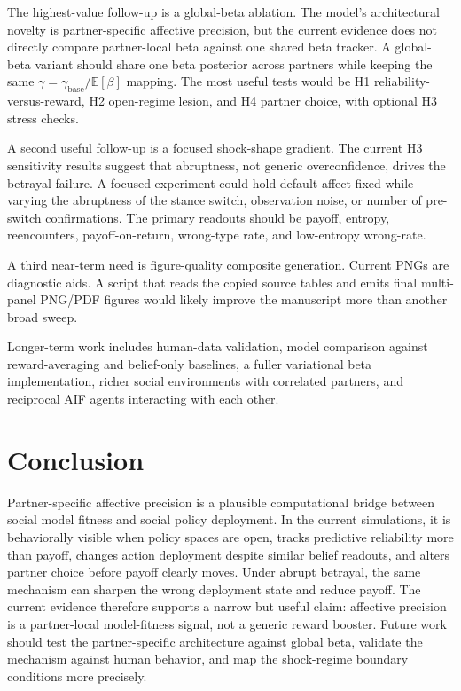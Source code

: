 The highest-value follow-up is a global-beta ablation. The model's architectural novelty is partner-specific affective precision, but the current evidence does not directly compare partner-local beta against one shared beta tracker. A global-beta variant should share one beta posterior across partners while keeping the same $\gamma=\gamma_{\mathrm{base}}/\mathbb{E}[\beta]$ mapping. The most useful tests would be H1 reliability-versus-reward, H2 open-regime lesion, and H4 partner choice, with optional H3 stress checks.

A second useful follow-up is a focused shock-shape gradient. The current H3 sensitivity results suggest that abruptness, not generic overconfidence, drives the betrayal failure. A focused experiment could hold default affect fixed while varying the abruptness of the stance switch, observation noise, or number of pre-switch confirmations. The primary readouts should be payoff, entropy, reencounters, payoff-on-return, wrong-type rate, and low-entropy wrong-rate.

A third near-term need is figure-quality composite generation. Current PNGs are diagnostic aids. A script that reads the copied source tables and emits final multi-panel PNG/PDF figures would likely improve the manuscript more than another broad sweep.

Longer-term work includes human-data validation, model comparison against reward-averaging and belief-only baselines, a fuller variational beta implementation, richer social environments with correlated partners, and reciprocal AIF agents interacting with each other.

\section{Conclusion}

Partner-specific affective precision is a plausible computational bridge between social model fitness and social policy deployment. In the current simulations, it is behaviorally visible when policy spaces are open, tracks predictive reliability more than payoff, changes action deployment despite similar belief readouts, and alters partner choice before payoff clearly moves. Under abrupt betrayal, the same mechanism can sharpen the wrong deployment state and reduce payoff. The current evidence therefore supports a narrow but useful claim: affective precision is a partner-local model-fitness signal, not a generic reward booster. Future work should test the partner-specific architecture against global beta, validate the mechanism against human behavior, and map the shock-regime boundary conditions more precisely.
